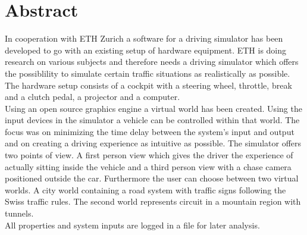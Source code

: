 \section*{Abstract}
In cooperation with ETH Zurich a software for a driving simulator has been developed to go with an existing setup of hardware equipment. ETH is doing research on various subjects and therefore needs a driving simulator which offers the possiblility to simulate certain traffic situations as realistically as possible.\\
The hardware setup consists of a cockpit with a steering wheel, throttle, break and a clutch pedal, a projector and a computer.\\
Using an open source graphics engine a virtual world has been created. Using the input devices in the simulator a vehicle can be controlled within that world. The focus was on minimizing the time delay between the system's input and output and on creating a driving experience as intuitive as possible. The simulator offers two points of view. A first person view which gives the driver the experience of actually sitting inside the vehicle and a third person view with a chase camera positioned outside the car. Furthermore the user can choose between two virtual worlds. A city world containing a road system with traffic signs following the Swiss traffic rules. The second world represents circuit in a mountain region with tunnels.\\
All properties and system inputs are logged in a file for later analysis.